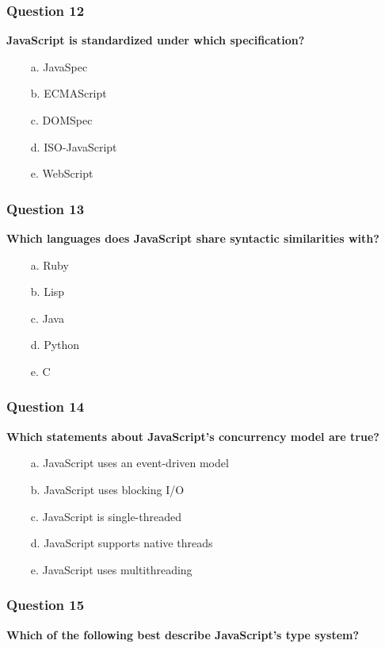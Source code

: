 \documentclass{article}
\newcommand{\cmark}{\textcolor{green}{\ding{51}}} %
\newcommand{\xmark}{\textcolor{red}{\ding{55}}}   %
\begin{document}
\subsubsection*{Question 12}
\textbf{JavaScript is standardized under which specification?}

\begin{itemize}
  \item[\xmark\ a.] JavaSpec
  \item[\cmark\ b.] ECMAScript
  \item[\xmark\ c.] DOMSpec
  \item[\xmark\ d.] ISO-JavaScript
  \item[\xmark\ e.] WebScript
\end{itemize}

\subsubsection*{Question 13}
\textbf{Which languages does JavaScript share syntactic similarities with?}

\begin{itemize}
  \item[\xmark\ a.] Ruby
  \item[\xmark\ b.] Lisp
  \item[\cmark\ c.] Java
  \item[\xmark\ d.] Python
  \item[\cmark\ e.] C
\end{itemize}

\subsubsection*{Question 14}
\textbf{Which statements about JavaScript's concurrency model are true?}

\begin{itemize}
  \item[\cmark\ a.] JavaScript uses an event-driven model
  \item[\xmark\ b.] JavaScript uses blocking I/O
  \item[\cmark\ c.] JavaScript is single-threaded
  \item[\xmark\ d.] JavaScript supports native threads
  \item[\xmark\ e.] JavaScript uses multithreading
\end{itemize}

\subsubsection*{Question 15}
\textbf{Which of the following best describe JavaScript's type system?}
\end{document}
